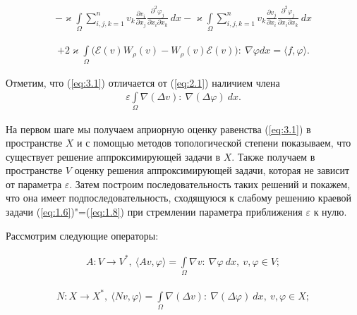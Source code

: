 \begin{equation*}
    \begin{gathered}
        - \varkappa \int\limits_\Omega \sum_{i,j,k=1}^n v_k \frac{\partial v_i}{\partial x_j}
        \frac{\partial^2 \varphi_j}{\partial x_i \partial x_k} \ dx
        - \varkappa \int\limits_\Omega \sum_{i,j,k=1}^n v_k \frac{\partial v_j}{\partial x_i}
        \frac{\partial^2 \varphi_j}{\partial x_i \partial x_k} \ dx
    \end{gathered}
\end{equation*}

\begin{equation}\label{eq:3.1}
    \begin{gathered}
        + 2 \varkappa \int\limits_\Omega \bigg(\mathcal{E}(v) W_\rho (v) - W_\rho (v) \mathcal{E}(v)\bigg): \ \nabla \varphi dx
        = \langle f, \varphi \rangle.
    \end{gathered}
\end{equation}

Отметим, что (\ref{eq:3.1}) отличается от (\ref{eq:2.1}) наличием члена
\begin{equation*}
    \begin{gathered}
        \varepsilon \int\limits_\Omega \nabla(\Delta v): \ \nabla(\Delta\varphi) \ dx.
    \end{gathered}
\end{equation*}

На первом шаге мы получаем априорную оценку равенства (\ref{eq:3.1}) в пространстве $X$
и с помощью методов топологической степени показываем, что существует решение аппроксимирующей задачи в $X$.
Также получаем в пространстве $V$ оценку решения аппроксимирующей задачи, которая не зависит от параметра $\varepsilon$.
Затем построим последовательность таких решений и покажем, что она имеет подпоследовательность,
сходящуюся к слабому решению краевой задачи (\ref{eq:1.6})"=(\ref{eq:1.8}) при стремлении параметра приближения $\varepsilon$ к нулю. 

Рассмотрим следующие операторы:

\begin{equation*}
    \begin{gathered}
        A: V \rightarrow V^*, \ \langle Av, \varphi \rangle = \int\limits_\Omega \nabla v: \ \nabla \varphi \ dx, \ v, \varphi \in V;
    \end{gathered}
\end{equation*}

\begin{equation*}
    \begin{gathered}
        N: X \rightarrow X^*, \ \langle Nv, \varphi \rangle = \int\limits_\Omega \nabla(\Delta v): \ \nabla(\Delta\varphi) \ dx, \ v, \varphi \in X;
    \end{gathered}
\end{equation*}

